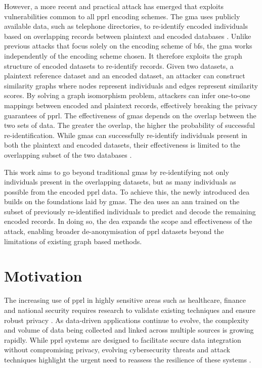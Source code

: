 However, a more recent and practical attack has emerged that exploits vulnerabilities common to all \ac{pprl} encoding schemes.
The \ac{gma} uses publicly available data, such as telephone directories, to re-identify encoded individuals based on overlapping records between plaintext and encoded databases \cite{vidanage2020graph, schaefer2024}.
Unlike previous attacks that focus solely on the encoding scheme of \ac{bf}s, the \ac{gma} works independently of the encoding scheme chosen.
It therefore exploits the graph structure of encoded datasets to re-identify records. Given two datasets, a plaintext reference dataset and an encoded dataset, an attacker can construct similarity graphs where nodes represent individuals and edges represent similarity scores.
By solving a graph isomorphism problem, attackers can infer one-to-one mappings between encoded and plaintext records, effectively breaking the privacy guarantees of \ac{pprl}.
The effectiveness of \ac{gma}s depends on the overlap between the two sets of data.
The greater the overlap, the higher the probability of successful re-identification.
While \ac{gma}s can successfully re-identify individuals present in both the plaintext and encoded datasets, their effectiveness is limited to the overlapping subset of the two databases \cite{schaefer2024,vidanage2020graph}.

This work aims to go beyond traditional \ac{gma}s by re-identifying not only individuals present in the overlapping datasets, but as many individuals as possible from the encoded \ac{pprl} data.
To achieve this, the newly introduced \ac{dea} builds on the foundations laid by \ac{gma}s.
The \ac{dea} uses an \ac{ann} trained on the subset of previously re-identified individuals to predict and decode the remaining encoded records.
In doing so, the \ac{dea} expands the scope and effectiveness of the attack, enabling broader de-anonymisation of \ac{pprl} datasets beyond the limitations of existing graph based methods.

\section{Motivation} \label{sec:motivation}

The increasing use of \ac{pprl} in highly sensitive areas such as healthcare, finance and national security requires research to validate existing techniques and ensure robust privacy \cite{schnell2009privacy}.
As data-driven applications continue to evolve, the complexity and volume of data being collected and linked across multiple sources is growing rapidly.
While \ac{pprl} systems are designed to facilitate secure data integration without compromising privacy, evolving cybersecurity threats and attack techniques highlight the urgent need to reassess the resilience of these systems \cite{vatsalan2017privacy}.

